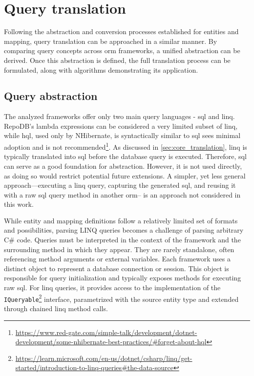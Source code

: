 \chapter{Query translation}\label{chapter:query_translation}
Following the abstraction and conversion processes established for entities and mapping, query translation can be approached in a similar manner. By comparing query concepts across \acrshort{orm} frameworks, a unified abstraction can be derived. Once this abstraction is defined, the full translation process can be formulated, along with algorithms demonstrating its application. 


\section{Query abstraction}
The analyzed frameworks offer only two main query languages - \acrshort{sql} and \acrshort{linq}. RepoDB's lambda expressions can be considered a very limited subset of \acrshort{linq}, while \acrshort{hql}, used only by NHibernate, is syntactically similar to \acrshort{sql} sees minimal adoption and is not recommended\footnote{\url{https://www.red-gate.com/simple-talk/development/dotnet-development/some-nhibernate-best-practices/\#forget-about-hql}}. As discussed in \autoref{sec:core_translation}, \acrshort{linq} is typically translated into \acrshort{sql} before the database query is executed. Therefore, \acrshort{sql} can serve as a good foundation for abstraction. However, it is not used directly, as doing so would restrict potential future extensions. A simpler, yet less general approach---executing a \acrshort{linq} query, capturing the generated \acrshort{sql}, and reusing it with a raw \acrshort{sql} query method in another \acrshort{orm}-- is an approach not considered in this work.

While entity and mapping definitions follow a relatively limited set of formats and possibilities, parsing LINQ queries becomes a challenge of parsing arbitrary C\# code. Queries must be interpreted in the context of the framework and the surrounding method in which they appear. They are rarely standalone, often referencing method arguments or external variables. Each framework uses a distinct object to represent a database connection or session. This object is responsible for query initialization and typically exposes methods for executing raw \acrshort{sql}. For \acrshort{linq} queries, it provides access to the implementation of the \texttt{IQueryable}\footnote{\url{https://learn.microsoft.com/en-us/dotnet/csharp/linq/get-started/introduction-to-linq-queries\#the-data-source}} interface, parametrized with the source entity type and extended through chained \acrshort{linq} method calls.

